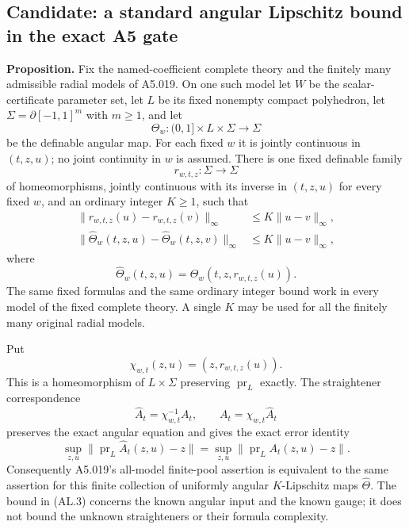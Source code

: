 \subsection*{Candidate: a standard angular Lipschitz bound in the exact A5 gate}

\textbf{Proposition.}\quad
Fix the named-coefficient complete theory and the finitely many admissible
radial models of A5.019. On one such model let $W$ be the scalar-certificate
parameter set, let $L$ be its fixed nonempty compact polyhedron, let
$\Sigma=\partial[-1,1]^m$ with $m\ge1$, and let
\[
 \Theta_w:(0,1]\times L\times\Sigma\longrightarrow\Sigma
 \tag{AL.1}
\]
be the definable angular map. For each fixed $w$ it is jointly continuous
in $(t,z,u)$; no joint continuity in $w$ is assumed.
There is one fixed definable family
\[
 r_{w,t,z}:\Sigma\longrightarrow\Sigma
 \tag{AL.2}
\]
of homeomorphisms, jointly continuous with its inverse in $(t,z,u)$ for
every fixed $w$, and an ordinary integer $K\ge1$, such that
\[
 \begin{split}
 \|r_{w,t,z}(u)-r_{w,t,z}(v)\|_\infty&\le K\|u-v\|_\infty,\\
 \|\widehat\Theta_w(t,z,u)-\widehat\Theta_w(t,z,v)\|_\infty
                                      &\le K\|u-v\|_\infty,
 \end{split}
 \tag{AL.3}
\]
where
\[
 \widehat\Theta_w(t,z,u)=\Theta_w(t,z,r_{w,t,z}(u)).
 \tag{AL.4}
\]
The same fixed formulas and the same ordinary integer bound work in
every model of the fixed complete theory. A single $K$ may be used for
all the finitely many original radial models.

Put
\[
 \chi_{w,t}(z,u)=(z,r_{w,t,z}(u)).
 \tag{AL.5}
\]
This is a homeomorphism of $L\times\Sigma$ preserving
$\operatorname{pr}_L$ exactly. The straightener correspondence
\[
 \widehat A_t=\chi_{w,t}^{-1}A_t,
 \qquad A_t=\chi_{w,t}\widehat A_t
 \tag{AL.6}
\]
preserves the exact angular equation and gives the exact error identity
\[
 \sup_{z,u}\|\operatorname{pr}_L\widehat A_t(z,u)-z\|
 =\sup_{z,u}\|\operatorname{pr}_L A_t(z,u)-z\|.
 \tag{AL.7}
\]
Consequently A5.019's all-model finite-pool assertion is equivalent to
the same assertion for this finite collection of uniformly angular
$K$-Lipschitz maps $\widehat\Theta$.
The bound in (AL.3) concerns the known angular input and the known gauge;
it does not bound the unknown straighteners or their formula complexity.

